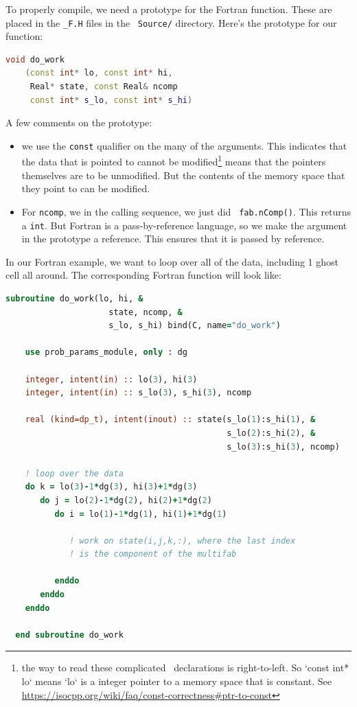 To properly compile, we need a prototype for the Fortran
function.  These are placed in the {\tt *\_F.H} files in the
\castro\ {\tt Source/} directory.  Here's the prototype for
our function:

\begin{lstlisting}[language=C++]
  void do_work
    (const int* lo, const int* hi,
     Real* state, const Real& ncomp
     const int* s_lo, const int* s_hi)
\end{lstlisting}

A few comments on the prototype:
\begin{itemize}
\item we use the {\tt const} qualifier on the many of the arguments.
  This indicates that the data that is pointed to cannot be
  modified\footnote{the way to read these complicated
    \cpp\ declarations is right-to-left.  So `const int* lo` means
    `lo` is a integer pointer to a memory space that is constant.  See
    \url{https://isocpp.org/wiki/faq/const-correctness\#ptr-to-const}}
    means that the pointers themselves are to be unmodified.  But the
    contents of the memory space that they point to can be modified.

\item For {\tt ncomp}, we in the calling sequence, we just did {\tt
  fab.nComp()}.  This returns a {\tt int}.  But Fortran is a
  pass-by-reference language, so we make the argument in the prototype
  a reference.  This ensures that it is passed by reference.
\end{itemize}

In our Fortran example, we want to loop over all of the data,
including 1 ghost cell all around.  The corresponding Fortran function
will look like:
\begin{lstlisting}[language=Fortran]
  subroutine do_work(lo, hi, &
                     state, ncomp, &
                     s_lo, s_hi) bind(C, name="do_work")

    use prob_params_module, only : dg

    integer, intent(in) :: lo(3), hi(3)
    integer, intent(in) :: s_lo(3), s_hi(3), ncomp

    real (kind=dp_t), intent(inout) :: state(s_lo(1):s_hi(1), &
                                             s_lo(2):s_hi(2), &
                                             s_lo(3):s_hi(3), ncomp)

    ! loop over the data
    do k = lo(3)-1*dg(3), hi(3)+1*dg(3)
       do j = lo(2)-1*dg(2), hi(2)+1*dg(2)
          do i = lo(1)-1*dg(1), hi(1)+1*dg(1)

             ! work on state(i,j,k,:), where the last index
             ! is the component of the multifab

          enddo
       enddo
    enddo

  end subroutine do_work
\end{lstlisting}

